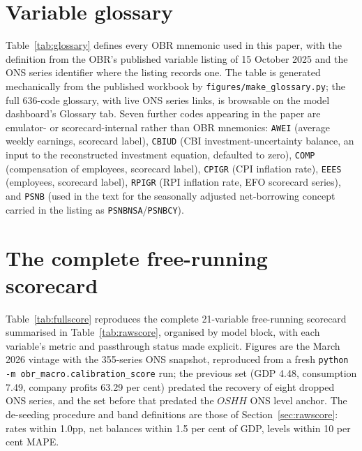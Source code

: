 \section{Variable glossary}
\label{app:glossary}

Table~\ref{tab:glossary} defines every OBR mnemonic used in this paper, with the definition from the OBR's published variable listing of 15 October 2025 and the ONS series identifier where the listing records one. The table is generated mechanically from the published workbook by \texttt{figures/\allowbreak make\_glossary.py}; the full 636-code glossary, with live ONS series links, is browsable on the model dashboard's Glossary tab. Seven further codes appearing in the paper are emulator- or scorecard-internal rather than OBR mnemonics: \texttt{AWEI} (average weekly earnings, scorecard label), \texttt{CBIUD} (CBI investment-uncertainty balance, an input to the reconstructed investment equation, defaulted to zero), \texttt{COMP} (compensation of employees, scorecard label), \texttt{CPIGR} (CPI inflation rate), \texttt{EEES} (employees, scorecard label), \texttt{RPIGR} (RPI inflation rate, EFO scorecard series), and \texttt{PSNB} (used in the text for the seasonally adjusted net-borrowing concept carried in the listing as \texttt{PSNBNSA}/\texttt{PSNBCY}).

{\small

}

\section{The complete free-running scorecard}
\label{app:scorecard}

Table~\ref{tab:fullscore} reproduces the complete 21-variable free-running scorecard summarised in Table~\ref{tab:rawscore}, organised by model block, with each variable's metric and passthrough status made explicit. Figures are the March 2026 vintage with the 355-series ONS snapshot, reproduced from a fresh \texttt{python -m obr\_macro.calibration\_score} run; the previous set (GDP 4.48, consumption 7.49, company profits 63.29 per cent) predated the recovery of eight dropped ONS series, and the set before that predated the $OSHH$ ONS level anchor. The de-seeding procedure and band definitions are those of Section~\ref{sec:rawscore}: rates within 1.0pp, net balances within 1.5 per cent of GDP, levels within 10 per cent MAPE.

